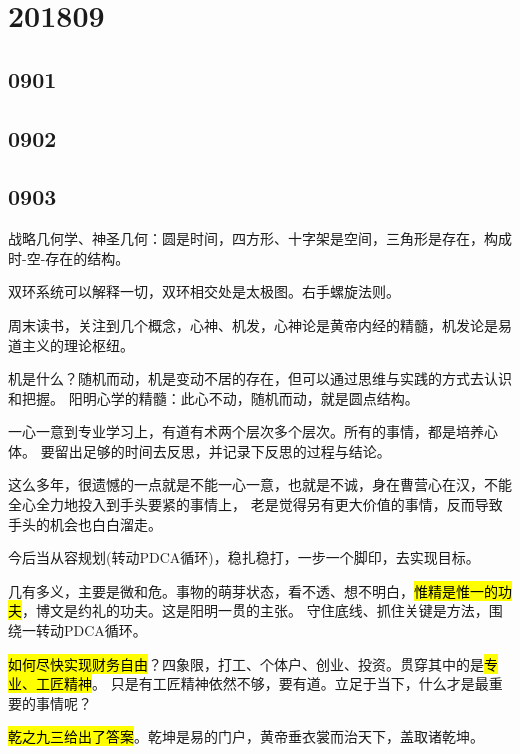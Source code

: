 \section{201809}

\subsection{0901}

\subsection{0902}

\subsection{0903}

战略几何学、神圣几何：圆是时间，四方形、十字架是空间，三角形是存在，构成时-空-存在的结构。

双环系统可以解释一切，双环相交处是太极图。右手螺旋法则。

周末读书，关注到几个概念，心神、机发，心神论是黄帝内经的精髓，机发论是易道主义的理论枢纽。

机是什么？随机而动，机是变动不居的存在，但可以通过思维与实践的方式去认识和把握。
阳明心学的精髓：此心不动，随机而动，就是圆点结构。

一心一意到专业学习上，有道有术两个层次多个层次。所有的事情，都是培养心体。
要留出足够的时间去反思，并记录下反思的过程与结论。

这么多年，很遗憾的一点就是不能一心一意，也就是不诚，身在曹营心在汉，不能全心全力地投入到手头要紧的事情上，
老是觉得另有更大价值的事情，反而导致手头的机会也白白溜走。

今后当从容规划(转动PDCA循环)，稳扎稳打，一步一个脚印，去实现目标。

几有多义，主要是微和危。事物的萌芽状态，看不透、想不明白，\hl{惟精是惟一的功夫}，博文是约礼的功夫。这是阳明一贯的主张。
守住底线、抓住关键是方法，围绕一转动PDCA循环。

\hl{如何尽快实现财务自由}？四象限，打工、个体户、创业、投资。贯穿其中的是\hl{专业、工匠精神}。
只是有工匠精神依然不够，要有道。立足于当下，什么才是最重要的事情呢？

\hl{乾之九三给出了答案}。乾坤是易的门户，黄帝垂衣裳而治天下，盖取诸乾坤。
